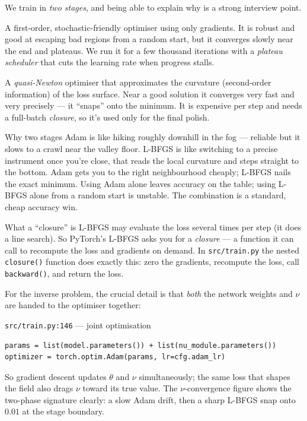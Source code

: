 \documentclass[11pt,a4paper]{article}
\begin{document}
We train in \emph{two stages}, and being able to explain why is a strong
interview point.

\begin{description}[leftmargin=2em, style=nextline]
  \item[Stage 1 --- Adam] A first-order, stochastic-friendly optimiser using
    only gradients. It is robust and good at escaping bad regions from a random
    start, but it converges slowly near the end and plateaus. We run it for a few
    thousand iterations with a \emph{plateau scheduler} that cuts the learning
    rate when progress stalls.
  \item[Stage 2 --- L-BFGS] A \emph{quasi-Newton} optimiser that approximates the
    curvature (second-order information) of the loss surface. Near a good
    solution it converges very fast and very precisely --- it ``snaps'' onto the
    minimum. It is expensive per step and needs a full-batch \emph{closure}, so
    it's used only for the final polish.
\end{description}

\begin{intuitionbox}{Why two stages}
Adam is like hiking roughly downhill in the fog --- reliable but it slows to a
crawl near the valley floor. L-BFGS is like switching to a precise instrument
once you're close, that reads the local curvature and steps straight to the
bottom. Adam gets you to the right neighbourhood cheaply; L-BFGS nails the exact
minimum. Using Adam alone leaves accuracy on the table; using L-BFGS alone from
a random start is unstable. The combination is a standard, cheap accuracy win.
\end{intuitionbox}

\begin{conceptbox}{What a ``closure'' is}
L-BFGS may evaluate the loss several times per step (it does a line search). So
PyTorch's L-BFGS asks you for a \emph{closure} --- a function it can call to
recompute the loss and gradients on demand. In \texttt{src/train.py} the nested
\texttt{closure()} function does exactly this: zero the gradients, recompute the
loss, call \texttt{backward()}, and return the loss.
\end{conceptbox}

For the inverse problem, the crucial detail is that \emph{both} the network
weights and $\nu$ are handed to the optimiser together:

\begin{coderef}{\texttt{src/train.py:146} --- joint optimisation}
\begin{lstlisting}[style=pycode]
params = list(model.parameters()) + list(nu_module.parameters())
optimizer = torch.optim.Adam(params, lr=cfg.adam_lr)
\end{lstlisting}
So gradient descent updates $\theta$ and $\nu$ simultaneously; the same loss that
shapes the field also drags $\nu$ toward its true value. The $\nu$-convergence
figure shows the two-phase signature clearly: a slow Adam drift, then a sharp
L-BFGS snap onto $0.01$ at the stage boundary.
\end{coderef}
\end{document}
